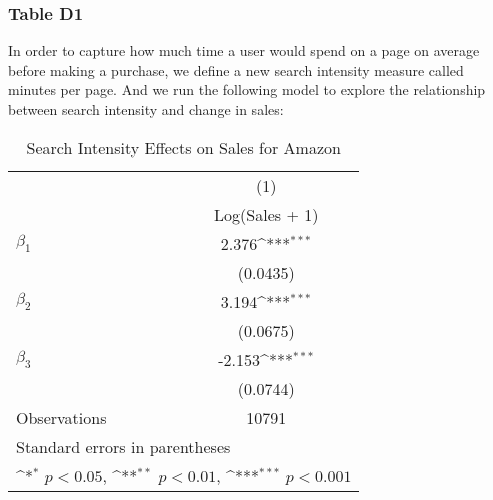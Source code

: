 \documentclass{article}
\begin{document}
\subsubsection{Table D1}
In order to capture how much time a user would spend on a page on average before making a purchase, we define a new search intensity measure called minutes per page. And we run the following model to explore the relationship between search intensity and change in sales:\\
\begin{table}[!h]\centering
	\def\sym#1{\ifmmode^{#1}\else\(^{#1}\)\fi}
	\caption{Search Intensity Effects on Sales for Amazon}
	\label{tab:tabD1}
	\begin{tabular}{l*{1}{c}}
		\\[-1.8ex]\hline 
		\hline
		&\multicolumn{1}{c}{(1)}\\
		&\multicolumn{1}{c}{Log(Sales + 1)}\\
		\midrule
		$\beta_1$         &       2.376\sym{***}\\
		&    (0.0435)         \\
		\addlinespace
		$\beta_2$      &       3.194\sym{***}\\
		&    (0.0675)         \\
		\addlinespace
		$\beta_3$            &      -2.153\sym{***}\\
		&    (0.0744)         \\
		\midrule
		Observations        &       10791         \\
		\bottomrule
		\multicolumn{2}{l}{\footnotesize Standard errors in parentheses}\\
		\multicolumn{2}{l}{\footnotesize \sym{*} \(p<0.05\), \sym{**} \(p<0.01\), \sym{***} \(p<0.001\)}\\ 
	\end{tabular}
\end{table}
\end{document}

